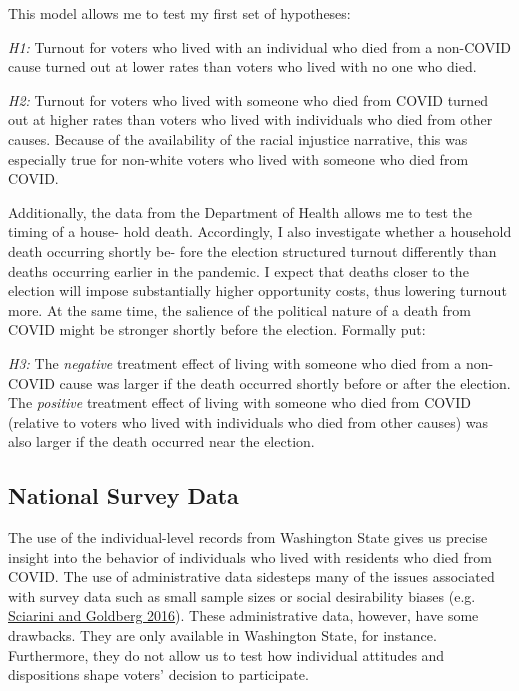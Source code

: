 \documentclass[
  12pt,
]{article}
\begin{document}
This model allows me to test my first set of hypotheses:

\emph{H1:} Turnout for voters who lived with an individual who died from a non-COVID cause turned out at lower rates than voters who lived with no one who died.

\emph{H2:} Turnout for voters who lived with someone who died from COVID turned out at higher rates than voters who lived with individuals who died from other causes. Because of the availability of the racial injustice narrative, this was especially true for non-white voters who lived with someone who died from COVID.

Additionally, the data from the Department of Health allows me to test the timing of a house- hold death. Accordingly, I also investigate whether a household death occurring shortly be- fore the election structured turnout differently than deaths occurring earlier in the pandemic. I expect that deaths closer to the election will impose substantially higher opportunity costs, thus lowering turnout more. At the same time, the salience of the political nature of a death from COVID might be stronger shortly before the election. Formally put:

\emph{H3:} The \emph{negative} treatment effect of living with someone who died from a non-COVID cause was larger if the death occurred shortly before or after the election. The \emph{positive} treatment effect of living with someone who died from COVID (relative to voters who lived
with individuals who died from other causes) was also larger if the death occurred near the election.

\hypertarget{national-survey-data}{%
\subsection*{National Survey Data}\label{national-survey-data}}

The use of the individual-level records from Washington State gives us precise insight into the behavior of individuals who lived with residents who died from COVID. The use of administrative data sidesteps many of the issues associated with survey data such as small sample sizes or social desirability biases (e.g. \protect\hyperlink{ref-Sciarini2016}{Sciarini and Goldberg 2016}). These administrative data, however, have some drawbacks. They are only available in Washington State, for instance. Furthermore, they do not allow us to test how individual attitudes and dispositions shape voters' decision to participate.
\end{document}

